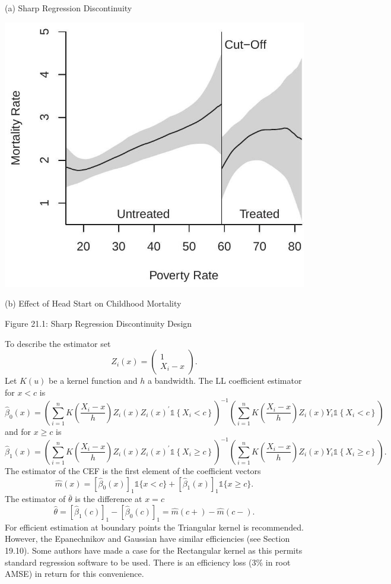\documentclass[10pt]{article}
\begin{document}
(a) Sharp Regression Discontinuity

\includegraphics[max width=\textwidth]{2022_10_23_bb8a8d8a5dc56cf142a9g-04(1)}

(b) Effect of Head Start on Childhood Mortality

Figure 21.1: Sharp Regression Discontinuity Design

To describe the estimator set
$$
Z_{i}(x)=\left(\begin{array}{c}
1 \\
X_{i}-x
\end{array}\right) .
$$
Let $K(u)$ be a kernel function and $h$ a bandwidth. The LL coefficient estimator for $x<c$ is
$$
\widehat{\beta}_{0}(x)=\left(\sum_{i=1}^{n} K\left(\frac{X_{i}-x}{h}\right) Z_{i}(x) Z_{i}(x)^{\prime} \mathbb{1}\left\{X_{i}<c\right\}\right)^{-1}\left(\sum_{i=1}^{n} K\left(\frac{X_{i}-x}{h}\right) Z_{i}(x) Y_{i} \mathbb{1}\left\{X_{i}<c\right\}\right)
$$
and for $x \geq c$ is
$$
\widehat{\beta}_{1}(x)=\left(\sum_{i=1}^{n} K\left(\frac{X_{i}-x}{h}\right) Z_{i}(x) Z_{i}(x)^{\prime} \mathbb{1}\left\{X_{i} \geq c\right\}\right)^{-1}\left(\sum_{i=1}^{n} K\left(\frac{X_{i}-x}{h}\right) Z_{i}(x) Y_{i} \mathbb{1}\left\{X_{i} \geq c\right\}\right) .
$$
The estimator of the CEF is the first element of the coefficient vectors
$$
\widehat{m}(x)=\left[\widehat{\beta}_{0}(x)\right]_{1} \mathbb{1}\{x<c\}+\left[\widehat{\beta}_{1}(x)\right]_{1} \mathbb{1}\{x \geq c\} .
$$
The estimator of $\bar{\theta}$ is the difference at $x=c$
$$
\widehat{\theta}=\left[\widehat{\beta}_{1}(c)\right]_{1}-\left[\widehat{\beta}_{0}(c)\right]_{1}=\widehat{m}(c+)-\widehat{m}(c-) .
$$
For efficient estimation at boundary points the Triangular kernel is recommended. However, the Epanechnikov and Gaussian have similar efficiencies (see Section 19.10). Some authors have made a case for the Rectangular kernel as this permits standard regression software to be used. There is an efficiency loss (3\% in root AMSE) in return for this convenience.
\end{document}
